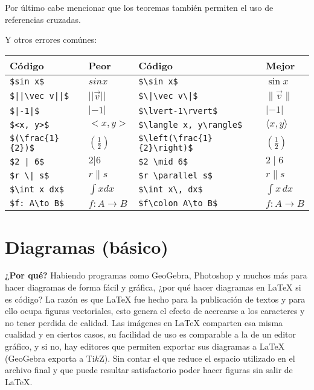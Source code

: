 \documentclass[intro-breve-latex.tex]{subfiles}
\begin{document}
Por último cabe mencionar que los teoremas también permiten el uso de referencias cruzadas.

Y otros errores comúnes:
\begin{longtable}{|ll|ll|}
	\hline
	Código & Peor & Código & Mejor \\
	\hline
	\endhead

	\hline
	\endfoot

	\lstinline|$sin x$| & $sin x$ & \lstinline|$\sin x$| & $\sin x$ \\
	\lstinline?$||\vec v||$? & $||\vec v||$ & \lstinline?$\|\vec v\|$? & $\|\vec v\|$ \\
	\lstinline?$|-1|$? & $|-1|$ & \lstinline|$\lvert-1\rvert$| & $\lvert-1\rvert$ \\
	\lstinline?$<x, y>$? & $<x, y>$ & \lstinline?$\langle x, y\rangle$? & $\langle x, y\rangle$ \\
	\lstinline?$(\frac{1}{2})$? & $\displaystyle (\frac{1}{2}) $ & \lstinline|$\left(\frac{1}{2}\right)$| & $\displaystyle \left(\frac{1}{2}\right) $ \\
	\lstinline?$2 | 6$? & $2 | 6$ & \lstinline|$2 \mid 6$| & $2 \mid 6$ \\
	\lstinline?$r \| s$? & $r \| s$ & \lstinline|$r \parallel s$| & $r \parallel s$ \\
	\lstinline|$\int x dx$| & $\int x dx$ & \lstinline|$\int x\, dx$| & $\int x\, dx$ \\
	\lstinline|$f: A\to B$| & $f: A\to B$ & \lstinline|$f\colon A\to B$| & $f\colon A\to B$ \\
\end{longtable}

\section{Diagramas (básico)}
\textbf{¿Por qué?} Habiendo programas como GeoGebra, Photoshop y muchos más para hacer diagramas de forma fácil y gráfica, ¿por qué hacer diagramas en \LaTeX{} si es código? La razón es que \LaTeX{} fue hecho para la publicación de textos y para ello ocupa figuras vectoriales, esto genera el efecto de acercarse a los caracteres y no tener perdida de calidad.
Las imágenes en \LaTeX{} comparten esa misma cualidad y en ciertos casos, su facilidad de uso es comparable a la de un editor gráfico, y si no, hay editores que permiten exportar sus diagramas a \LaTeX{} (GeoGebra exporta a Ti$k$Z). Sin contar el que reduce el espacio utilizado en el archivo final y que puede resultar satisfactorio poder hacer figuras sin salir de \LaTeX{}.
\end{document}
